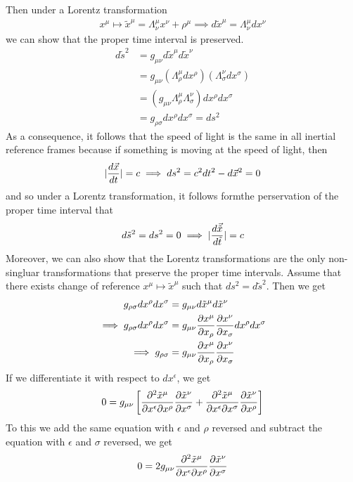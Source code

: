 Then under a Lorentz transformation
\begin{align*}
  x^{\mu} \mapsto \tilde{x}^{\mu} = \Lambda_{\nu}^{\mu}x^{\nu} + \rho^{\mu} \implies d \tilde{x}^{\mu} = \Lambda_{\nu}^{\mu}dx^{\nu}
\end{align*}
we can show that the proper time interval is preserved.
\begin{align*}
  d \tilde{s}^{2} 
  &= g_{\mu\nu}d \tilde{x}^{\mu}d \tilde{x}^{\nu}\\
  &= g_{\mu\nu}\left(
    \Lambda_{\rho}^{\mu}dx^{\rho}
  \right)\left(
    \Lambda_{\sigma}^{\nu}dx^{\sigma}
  \right)\\
  &= \left(
    g_{\mu\nu} \Lambda_{\rho}^{\mu}\Lambda_{\sigma}^{\nu}
  \right)
  dx^{\rho}dx^{\sigma}\\
  &= g_{\rho \sigma}dx^{\rho}dx^{\sigma} = ds^{2}
\end{align*}
As a consequence, it follows that the speed of light is the same in all inertial reference frames because if something is moving at the speed of light, then
\begin{align*}
  \vert\frac{d \vec{x}}{d t}\vert = c \implies d s^{2} = c^{2} dt^{2} - d \vec{x}^{2} = 0
\end{align*}
and so under a Lorentz transformation, it follows formthe perservation of the proper time interval that 
\begin{align*}
d \tilde{s}^{2} = ds^{2} = 0 \implies \vert\frac{d \vec{\tilde{x}}}{d \tilde{t}}\vert = c
\end{align*}
Moreover, we can also show that the Lorentz transformations are the only non-singluar transformations that preserve the proper time intervals.
Assume that there exists change of reference $x^{\mu} \mapsto \tilde{x}^{\mu}$ such that $ds^{2} = d \tilde{s}^{2}$.
Then we get
\begin{align*}
  g_{\rho \sigma}dx^{\rho}dx^{\sigma} 
  &= 
  g_{\mu\nu} d \tilde{x}^{\mu}d \tilde{x}^{\nu}\\
  \implies g_{\rho \sigma}dx^{\rho}dx^{\sigma} 
  &=
  g_{\mu\nu} \frac{\partial x^{\mu}}{\partial x_{\rho}}\frac{\partial x^{\nu}}{\partial x_{\sigma}}dx^{\rho}dx^{\sigma}\\
  \implies
  g_{\rho \sigma} 
  &= g_{\mu\nu}\frac{\partial x^{\mu}}{\partial x_{\rho}}\frac{\partial x^{\nu}}{\partial x_{\sigma}}
\end{align*}
If we differentiate it with respect to $dx^{\epsilon}$, we get
\begin{align*}
  0 = g_{\mu\nu} \left[\frac{\partial^{2}\tilde{x}^{\mu}}{\partial x^{\epsilon}\partial x^{\rho}} \frac{\partial \tilde{x}^{\nu}}{\partial x^{\sigma}} + \frac{\partial^{2}\tilde{x}^{\mu}}{\partial x^{\epsilon}\partial x^{\sigma}} \frac{\partial \tilde{x}^{\nu}}{\partial x^{\rho}}\right]
\end{align*}
To this we add the same equation with $\epsilon$ and $\rho$ reversed and subtract the equation with $\epsilon$ and $\sigma$ reversed, we get
\begin{align*}
  0 = 2 g_{\mu\nu} \frac{\partial^{2} \tilde{x}^{\mu}}{\partial x^{\epsilon}\partial x^{\rho}} \frac{\partial \tilde{x}^{\nu}}{\partial x^{\sigma}}
\end{align*}



